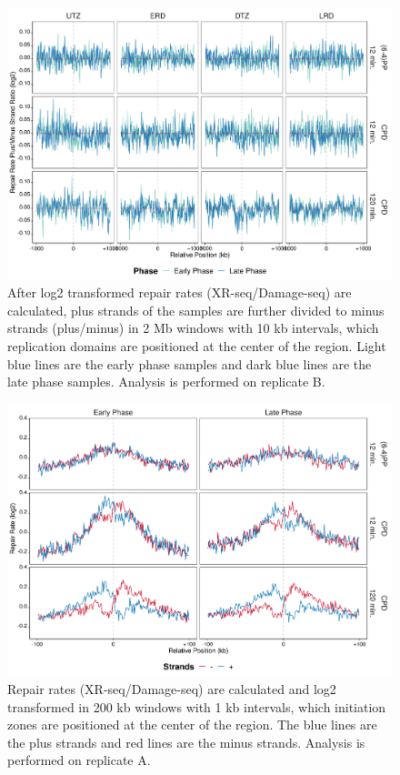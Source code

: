 \begin{figure}[H]
\begin{center}
\includegraphics[width=\textwidth]{Chapters/7_appendix/figures/supfig35}
\caption[Repair rate plus/minus phase ratio of replication domains in 2 Mb (replicate B).]{After log2 transformed repair rates (XR-seq/Damage-seq) are calculated, plus strands of the samples are further divided to minus strands (plus/minus) in 2 Mb windows with 10 kb intervals, which replication domains are positioned at the center of the region. Light blue lines are the early phase samples and dark blue lines are the late phase samples. Analysis is performed on replicate B.}
\label{supfig:rrpm2000repdomainB}
\end{center}
\end{figure}

\begin{figure}[H]
\begin{center}
\includegraphics[width=\textwidth]{Chapters/7_appendix/figures/supfig36}
\caption[Repair rate of initiation zones in 200 kb (replicate A).]{Repair rates (XR-seq/Damage-seq) are calculated and log2 transformed in 200 kb windows with 1 kb intervals, which initiation zones are positioned at the center of the region. The blue lines are the plus strands and red lines are the minus strands. Analysis is performed on replicate A.}
\label{supfig:rr200inzonesA}
\end{center}
\end{figure}

